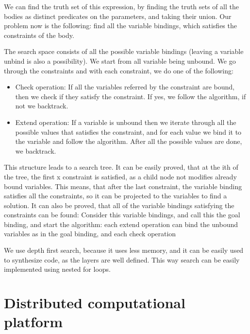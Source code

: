 We can find the truth set of this expression, by finding the truth sets of all the bodies as distinct predicates on the parameters, and taking their union.
Our problem now is the following: find all the variable bindings, which satisfies the constraints of the body.


The search space consists of all the possible variable bindings (leaving a variable unbind is also a possibility). 
We start from all variable being unbound. 
We go through the constraints and with each constraint, we do one of the following:
\begin{itemize}
	\item Check operation: If all the variables referred by the constraint are bound, then we check if they satisfy the constraint. If yes, we follow the algorithm, if not we backtrack.
	\item Extend operation: If a variable is unbound then we iterate through all the possible values that satisfies the constraint, and for each value we bind it to the variable and follow the algorithm. After all the possible values are done, we backtrack.
\end{itemize}

This structure leads to a search tree.
It can be easily proved, that at the ith of the tree, the first x constraint is satisfied, as a child node not modifies already bound variables.
This means, that after the last constraint, the variable binding satisfies all the constraints, so it can be projected to the variables to find a solution.
It can also be proved, that all of the variable bindings satisfying the constraints can be found: 
Consider this variable bindings, and call this the goal binding, and start the algorithm: each extend operation can bind the unbound variables as in the goal binding, and each check operation 

We use depth first search, because it uses less memory, and it can be easily used to synthesize code, as the layers are well defined. This way search can be easily implemented using nested for loops.


\section{Distributed computational platform}


